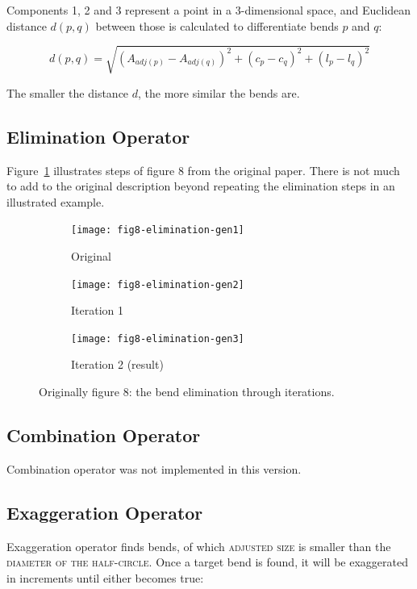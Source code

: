 \documentclass[a4paper]{article}
\begin{document}
Components 1, 2 and 3 represent a point in a 3-dimensional space, and Euclidean
distance $d(p,q)$ between those is calculated to differentiate bends $p$ and
$q$:

\[
  d(p,q) = \sqrt{(A_{adj(p)}-A_{adj(q)})^2 +
                   (c_p-c_q)^2 +
                   (l_p-l_q)^2}
\]

The smaller the distance $d$, the more similar the bends are.

\subsection{Elimination Operator}

Figure~\ref{fig:elimination-through-iterations} illustrates steps of figure 8
from the original paper. There is not much to add to the original description
beyond repeating the elimination steps in an illustrated example.

\begin{figure}[ht]
    \centering
    \begin{subfigure}[b]{.7\textwidth}
        \texttt{[image: fig8-elimination-gen1]}
        \caption{Original}
    \end{subfigure}
    \begin{subfigure}[b]{.7\textwidth}
        \texttt{[image: fig8-elimination-gen2]}
        \caption{Iteration 1}
    \end{subfigure}
    \begin{subfigure}[b]{.7\textwidth}
        \texttt{[image: fig8-elimination-gen3]}
        \caption{Iteration 2 (result)}
    \end{subfigure}
    \caption{Originally figure 8: the bend elimination through iterations.}
    \label{fig:elimination-through-iterations}
\end{figure}

\subsection{Combination Operator}
\label{sec:combination-operator}

Combination operator was not implemented in this version.

\subsection{Exaggeration Operator}
\label{sec:exaggeration-operator}

Exaggeration operator finds bends, of which \textsc{adjusted size} is smaller
than the \textsc{diameter of the half-circle}. Once a target bend is found, it
will be exaggerated in increments until either becomes true:
\end{document}
